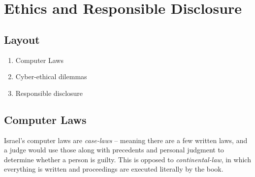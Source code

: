 \chapter{Ethics and Responsible Disclosure} \label{ethics_chapter}

\section*{Layout}

\begin{enumerate}
    \item Computer Laws
    \item Cyber-ethical dilemmas
    \item Responsible disclosure
\end{enumerate}

\section{Computer Laws}\label{sec:comp_laws}

Israel's computer laws are \textit{case-laws} – meaning there are a few written
laws, and a judge would use those along with precedents and personal judgment to
determine whether a person is guilty. This is opposed to
\textit{continental-law}, in which everything is written and proceedings are
executed literally by the book.

